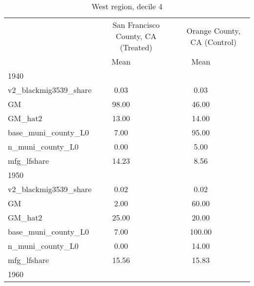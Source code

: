\begin{table}[htbp]\centering
\def\sym#1{\ifmmode^{#1}\else\(^{#1}\)\fi}
\caption{West region, decile 4 \label{tab1}}
\begin{tabular}{l*{2}{ccc}}
\toprule
                    &\multicolumn{3}{c}{San Francisco County, CA (Treated)}&\multicolumn{3}{c}{Orange County, CA (Control)}\\
                    &        Mean&            &            &        Mean&            &            \\
\midrule
1940                &            &            &            &            &            &            \\
v2\_blackmig3539\_share&        0.03&            &            &        0.03&            &            \\
GM                  &       98.00&            &            &       46.00&            &            \\
GM\_hat2             &       13.00&            &            &       14.00&            &            \\
base\_muni\_county\_L0 &        7.00&            &            &       95.00&            &            \\
n\_muni\_county\_L0    &        0.00&            &            &        5.00&            &            \\
mfg\_lfshare         &       14.23&            &            &        8.56&            &            \\
\midrule
1950                &            &            &            &            &            &            \\
v2\_blackmig3539\_share&        0.02&            &            &        0.02&            &            \\
GM                  &        2.00&            &            &       60.00&            &            \\
GM\_hat2             &       25.00&            &            &       20.00&            &            \\
base\_muni\_county\_L0 &        7.00&            &            &      100.00&            &            \\
n\_muni\_county\_L0    &        0.00&            &            &       14.00&            &            \\
mfg\_lfshare         &       15.56&            &            &       15.83&            &            \\
\midrule
1960                &            &            &            &            &            &            \\

\end{tabular}
\end{table}
